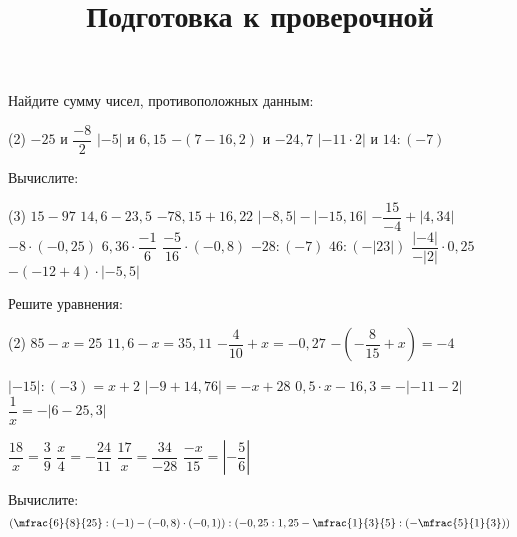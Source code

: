 \begin{class}[number=2]
	\title{Подготовка к проверочной}
	\begin{listofex}
		\item Найдите сумму чисел, противоположных данным:
		\begin{tasks}(2)
			\task \( -25 \) и  \( \dfrac{-8}{2} \)
			\task \( |-5| \) и \( 6,15 \)
			\task \( -(7-16,2) \) и \( -24,7 \)
			\task \( |-11 \cdot 2| \) и \( 14:(-7) \)
		\end{tasks}
		\item Вычислите:
		\begin{tasks}(3)
			\task \( 15 - 97 \)
			\task \( 14,6-23,5 \)
			\task \( -78,15 + 16,22 \)
			\task \( |-8,5| - |-15,16| \)
			\task \( -\dfrac{15}{-4} + |4,34| \)
			\task \( -8 \cdot (-0,25)\)
			\task \( 6,36 \cdot \dfrac{-1}{6} \)
			\task \( \dfrac{-5}{16} \cdot (-0,8) \)
			\task \( -28 : (-7) \)
			\task \( 46 : (-|23|) \)
			\task \( \dfrac{|-4|}{-|2|} \cdot 0,25 \)
			\task \( -(-12 + 4) \cdot |-5,5| \)
		\end{tasks}
		\item Решите уравнения:
		\begin{tasks}(2)
			\task \( 85-x=25 \)
			\task \( 11,6-x=35,11 \)
			\task \( -\dfrac{4}{10}+x=-0,27 \)
			\task \( -\left( -\dfrac{8}{15} + x \right) = -4 \)
			
			\task \( |-15|:(-3)=x+2 \)
			\task \( |-9 + 14,76| = -x+28 \)
			\task \( 0,5 \cdot x-16,3=- |-11-2| \)
			\task \( \dfrac{1}{x} = -|6-25,3| \)
			
			\task \( \dfrac{18}{x} = \dfrac{3}{9} \)
			\task \( \dfrac{x}{4} = -\dfrac{24}{11} \)
			\task \( \dfrac{17}{x} = \dfrac{34}{-28} \)
			\task \( \dfrac{-x}{15} = \left| -\dfrac{5}{6} \right| \)
		\end{tasks}
		\item Вычислите: %
			\[ \left( \mfrac{6}{8}{25}:(-1)-(-0,8)\cdot(-0,1)\right) : \left( -0,25:1,25 - \mfrac{1}{3}{5} : \left( -\mfrac{5}{1}{3} \right) \right) \]
	\end{listofex}
\end{class}

